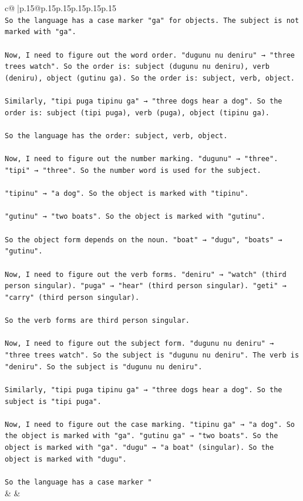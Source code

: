 \documentclass{article}
\begin{document}
{\begin{supertabular}{c@{$\;$}|p{.15\linewidth}@{}p{.15\linewidth}p{.15\linewidth}p{.15\linewidth}p{.15\linewidth}p{.15\linewidth}}
{{{\\ 
\texttt{So the language has a case marker "ga" for objects. The subject is not marked with "ga".} \\
\\ 
\texttt{Now, I need to figure out the word order. "dugunu nu deniru" → "three trees watch". So the order is: subject (dugunu nu deniru), verb (deniru), object (gutinu ga). So the order is: subject, verb, object.} \\
\\ 
\texttt{Similarly, "tipi puga tipinu ga" → "three dogs hear a dog". So the order is: subject (tipi puga), verb (puga), object (tipinu ga).} \\
\\ 
\texttt{So the language has the order: subject, verb, object.} \\
\\ 
\texttt{Now, I need to figure out the number marking. "dugunu" → "three". "tipi" → "three". So the number word is used for the subject.} \\
\\ 
\texttt{"tipinu" → "a dog". So the object is marked with "tipinu".} \\
\\ 
\texttt{"gutinu" → "two boats". So the object is marked with "gutinu".} \\
\\ 
\texttt{So the object form depends on the noun. "boat" → "dugu", "boats" → "gutinu".} \\
\\ 
\texttt{Now, I need to figure out the verb forms. "deniru" → "watch" (third person singular). "puga" → "hear" (third person singular). "geti" → "carry" (third person singular).} \\
\\ 
\texttt{So the verb forms are third person singular.} \\
\\ 
\texttt{Now, I need to figure out the subject form. "dugunu nu deniru" → "three trees watch". So the subject is "dugunu nu deniru". The verb is "deniru". So the subject is "dugunu nu deniru".} \\
\\ 
\texttt{Similarly, "tipi puga tipinu ga" → "three dogs hear a dog". So the subject is "tipi puga".} \\
\\ 
\texttt{Now, I need to figure out the case marking. "tipinu ga" → "a dog". So the object is marked with "ga". "gutinu ga" → "two boats". So the object is marked with "ga". "dugu" → "a boat" (singular). So the object is marked with "dugu".} \\
\\ 
\texttt{So the language has a case marker "} \\
            }
        }
    }
    & & \\ \\


\end{supertabular}}
\end{document}
